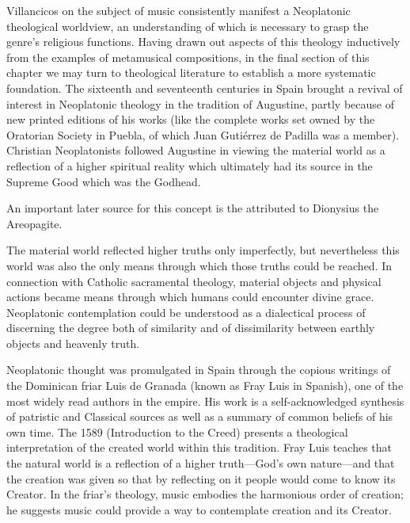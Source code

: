 Villancicos on the subject of music consistently manifest a Neoplatonic
theological worldview, an understanding of which is necessary to grasp the
genre's religious functions.
Having drawn out aspects of this theology inductively from the examples of
metamusical compositions, in the final section of this chapter we may turn to
theological literature to establish a more systematic foundation.
The sixteenth and seventeenth centuries in Spain brought a revival of interest
in Neoplatonic theology in the tradition of Augustine, partly because of new
printed editions of his works (like the complete works set owned by the
Oratorian Society in Puebla, of which Juan Gutiérrez de Padilla was a member).%
    \Autocites
    {Augustine:Opera1555}
    {Weber:ReligiousLitSpain}
    {Mauleon:PadillaCivil}
Christian Neoplatonists followed Augustine in viewing the material
world as a reflection of a higher spiritual reality which ultimately had its
source in the Supreme Good which was the Godhead.%
\begin{Footnote}
    An important later source for this concept is the  attributed to Dionysius the Areopagite.
\end{Footnote}
The material world reflected higher truths only imperfectly, but nevertheless
this world was also the only means through which those truths could be reached.
In connection with Catholic sacramental theology, material objects and physical
actions became means through which humans could encounter divine grace.
Neoplatonic contemplation could be understood as a dialectical process of
discerning the degree both of similarity and of dissimilarity between earthly
objects and heavenly truth.

Neoplatonic thought was promulgated in Spain through the copious writings of
the Dominican friar Luis de Granada (known as Fray Luis in Spanish), one of the
most widely read authors in the empire.%
    \citXXX[readership]
His work is a self-acknowledged synthesis of patristic and Classical
sources as well as a summary of common beliefs of his own time.
The 1589  (Introduction to the Creed)
presents a theological interpretation of the created world within this
tradition.%
    \Autocites
    {LuisdeGranada-Balcells:SimboloPtI}
    {LuisdeGranada:Simbolo}
Fray Luis teaches that the natural world is a reflection of a higher
truth---God's own nature---and that the creation was given so that by
reflecting on it people would come to know its Creator.
In the friar's theology, music embodies the harmonious order of creation; he
suggests music could provide a way to contemplate creation and its
Creator.

